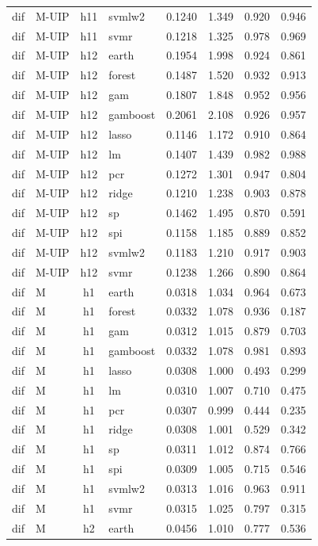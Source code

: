 \begin{ThreePartTable}
\begin{longtable}[t]{llclcccc}
dif & M-UIP & h11 & svmlw2 & 0.1240 & 1.349 & 0.920 & 0.946\\
dif & M-UIP & h11 & svmr & 0.1218 & 1.325 & 0.978 & 0.969\\
\addlinespace
dif & M-UIP & h12 & earth & 0.1954 & 1.998 & 0.924 & 0.861\\
dif & M-UIP & h12 & forest & 0.1487 & 1.520 & 0.932 & 0.913\\
dif & M-UIP & h12 & gam & 0.1807 & 1.848 & 0.952 & 0.956\\
dif & M-UIP & h12 & gamboost & 0.2061 & 2.108 & 0.926 & 0.957\\
dif & M-UIP & h12 & lasso & 0.1146 & 1.172 & 0.910 & 0.864\\
dif & M-UIP & h12 & lm & 0.1407 & 1.439 & 0.982 & 0.988\\
dif & M-UIP & h12 & pcr & 0.1272 & 1.301 & 0.947 & 0.804\\
dif & M-UIP & h12 & ridge & 0.1210 & 1.238 & 0.903 & 0.878\\
dif & M-UIP & h12 & sp & 0.1462 & 1.495 & 0.870 & 0.591\\
dif & M-UIP & h12 & spi & 0.1158 & 1.185 & 0.889 & 0.852\\
dif & M-UIP & h12 & svmlw2 & 0.1183 & 1.210 & 0.917 & 0.903\\
dif & M-UIP & h12 & svmr & 0.1238 & 1.266 & 0.890 & 0.864\\
\addlinespace
dif & M & h1 & earth & 0.0318 & 1.034 & 0.964 & 0.673\\
dif & M & h1 & forest & 0.0332 & 1.078 & 0.936 & 0.187\\
dif & M & h1 & gam & 0.0312 & 1.015 & 0.879 & 0.703\\
dif & M & h1 & gamboost & 0.0332 & 1.078 & 0.981 & 0.893\\
dif & M & h1 & lasso & 0.0308 & 1.000 & 0.493 & 0.299\\
dif & M & h1 & lm & 0.0310 & 1.007 & 0.710 & 0.475\\
dif & M & h1 & pcr & 0.0307 & 0.999 & 0.444 & 0.235\\
dif & M & h1 & ridge & 0.0308 & 1.001 & 0.529 & 0.342\\
dif & M & h1 & sp & 0.0311 & 1.012 & 0.874 & 0.766\\
dif & M & h1 & spi & 0.0309 & 1.005 & 0.715 & 0.546\\
dif & M & h1 & svmlw2 & 0.0313 & 1.016 & 0.963 & 0.911\\
dif & M & h1 & svmr & 0.0315 & 1.025 & 0.797 & 0.315\\
\addlinespace
dif & M & h2 & earth & 0.0456 & 1.010 & 0.777 & 0.536\\

\end{longtable}
\end{ThreePartTable}
